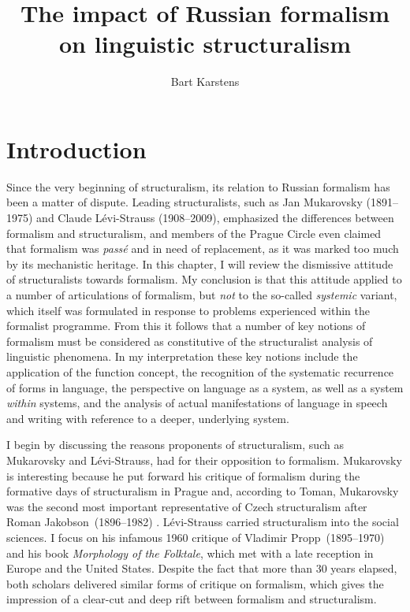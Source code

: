 \documentclass[output=paper]{langscibook}
\author{Bart Karstens \affiliation{Vrije Universiteit Amsterdam}}
\title{The impact of Russian formalism on linguistic structuralism}
\begin{document}
\maketitle

\section{Introduction} 
\label{sec:karstens:intro}

Since the very beginning of structuralism, its relation to Russian formalism has been a matter of dispute. Leading structuralists, such as Jan Muka\-rov\-sky (1891--1975) and Claude Lévi-Strauss (1908--2009), emphasized the differences between formalism and structuralism, and members of the Prague Circle even claimed that formalism was \emph{passé} and in need of replacement, as it was marked too much by its mechanistic heritage. In this chapter, I will review the dismissive attitude of structuralists towards formalism. My conclusion is that this attitude applied to a number of articulations of formalism, but \emph{not} to the so-called \emph{systemic} variant, which itself was formulated in response to problems experienced within the formalist programme. From this it follows that a number of key notions of formalism must be considered as constitutive of the structuralist analysis of linguistic phenomena. In my interpretation these key notions include the application of the function concept, the recognition of the systematic recurrence of forms in language, the perspective on language as a system, as well as a system \emph{within} systems, and the analysis of actual manifestations of language in speech and writing with reference to a deeper, underlying system.

I begin by discussing the reasons proponents of structuralism, such as Mu\-ka\-rov\-sky and Lévi-Strauss, had for their opposition to formalism. Mukarovsky is interesting because he put forward his critique of formalism during the formative days of structuralism in Prague and, according to Toman, Mukarovsky was the second most important representative of Czech structuralism after Roman Jakobson~(1896--1982) \citep[128]{Toman1995}. Lévi-Strauss carried structuralism into the social sciences. I focus on his infamous 1960 critique of Vladimir Propp~(1895--1970) and his \citeyear{Propp1928} book \emph{Morphology of the Folktale}, which met with a late reception in Europe and the United States. Despite the fact that more than 30 years elapsed, both scholars delivered similar forms of critique on formalism, which gives the impression of a clear-cut and deep rift between formalism and structuralism.  
\end{document}
